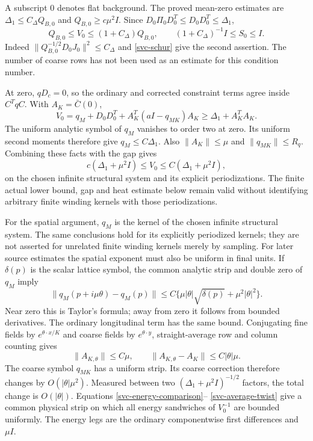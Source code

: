 \documentclass[11pt]{article}
\theoremstyle{remark}
\begin{document}
A subscript $0$ denotes flat background. The proved mean-zero estimates
are $\Delta_1\le C_\Delta Q_{B,0}$ and
$Q_{B,0}\ge c\mu^2I$. Since
$D_0\Pi_0D_0^T\le D_0D_0^T\le\Delta_1$,
\begin{equation}
 Q_{B,0}\le V_0\le(1+C_\Delta)Q_{B,0},\qquad
 (1+C_\Delta)^{-1}I\le S_0\le I.
 \label{svc-flat-comparison}
\end{equation}
Indeed $\|Q_{B,0}^{-1/2}D_0J_0\|^2\le C_\Delta$ and
\eqref{svc-schur} give the second assertion. The number of coarse
rows has not been used as an estimate for this condition number.

At zero, $qD_c=0$, so the ordinary and corrected constraint terms
agree inside $C^TqC$. With $A_K=\bar C(0)$,
\begin{equation}
 V_0=q_M+D_0D_0^T+A_K^T(aI-q_{MK})A_K
       \ge\Delta_1+A_K^TA_K.
 \label{svc-flat-vector}
\end{equation}
The uniform analytic symbol of $q_M$ vanishes to order two at zero.
Its uniform second moments therefore give $q_M\le C\Delta_1$.
Also $\|A_K\|\le\mu$ and $\|q_{MK}\|\le R_q$.
Combining these facts with the gap gives
\begin{equation}
 c(\Delta_1+\mu^2I)\le V_0\le C(\Delta_1+\mu^2I),
 \label{svc-energy-comparison}
\end{equation}
on the chosen infinite structural system and its explicit periodizations. The finite actual lower bound, gap and heat estimate below remain valid without identifying arbitrary finite winding kernels with those periodizations.

For the spatial argument, $q_M$ is the kernel of the chosen infinite structural system. The same conclusions hold for its explicitly periodized kernels; they are not asserted for unrelated finite winding kernels merely by sampling. For later source estimates the spatial exponent must also be uniform
in final units. If $\delta(p)$ is the scalar lattice symbol, the common
analytic strip and double zero of $q_M$ imply
\begin{equation}
 \|q_M(p+i\mu\theta)-q_M(p)\|
 \le C\{\mu|\theta|\sqrt{\delta(p)}+\mu^2|\theta|^2\}.
 \label{svc-fine-twist}
\end{equation}
Near zero this is Taylor's formula; away from zero it follows from
bounded derivatives. The ordinary longitudinal term has the same bound.
Conjugating fine fields by $e^{\theta\cdot x/K}$ and coarse fields by
$e^{\theta\cdot y}$, straight-average row and column counting gives
\begin{equation}
 \|A_{K,\theta}\|\le C\mu,\qquad
 \|A_{K,\theta}-A_K\|\le C|\theta|\mu.
 \label{svc-average-twist}
\end{equation}
The coarse symbol $q_{MK}$ has a uniform strip. Its coarse correction
therefore changes by $O(|\theta|\mu^2)$.
Measured between two $(\Delta_1+\mu^2I)^{-1/2}$ factors, the total
change is $O(|\theta|)$. Equations \eqref{svc-energy-comparison}--
\eqref{svc-average-twist} give a common physical strip on which all
energy sandwiches of $V_0^{-1}$ are bounded uniformly. The energy legs
are the ordinary componentwise first differences and $\mu I$.
\end{document}
